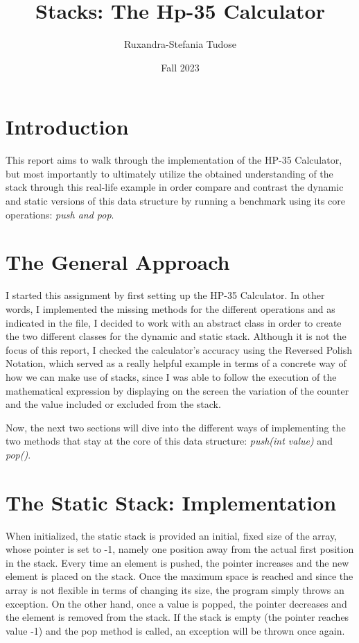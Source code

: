 \documentclass[a4paper,11pt]{article}
\begin{document}
\title{
    \textbf{Stacks: The Hp-35 Calculator}
}
\author{Ruxandra-Stefania Tudose}
\date{Fall 2023}

\maketitle

\section*{Introduction}

This report aims to walk through the implementation of the HP-35 Calculator, but most importantly 
to ultimately utilize the obtained understanding of the stack through this real-life example in order compare and contrast the dynamic and static versions of this data
structure by running a benchmark using its core operations: \textit{push and pop}.

\section*{The General Approach}

I started this assignment by first setting up the HP-35 Calculator. In other words, I implemented the 
missing methods for the different operations and as indicated in the file, I decided to work with an abstract class in order to create the two different 
classes for the dynamic and static stack. Although it is not the focus of this report, I checked the calculator's accuracy using the Reversed Polish Notation, which 
served as a really helpful example in terms of a concrete way of how we can make use of stacks, since I was able to follow the execution of the mathematical 
expression by displaying
on the screen the variation of the counter and the value included or excluded from the stack. \newline

Now, the next two sections will dive into the different ways of implementing the two methods that stay at the core of this data structure: 
\textit{push(int value)} and \textit{pop()}.

\section*{The Static Stack: Implementation}

When initialized, the static stack is provided an initial, fixed size of the array, whose pointer is set to -1, namely one position away from the 
actual first position in the stack. Every time an element is pushed, the pointer increases and the new element is placed on the stack. 
Once the maximum space is reached
and since the array is not flexible in terms of changing its size,
the program simply throws an exception. On the other hand, once a value is popped, the pointer decreases and the element is removed from the stack. If the stack is
empty (the pointer reaches value -1) and the pop method is called, an exception will be thrown once again.
\end{document}
